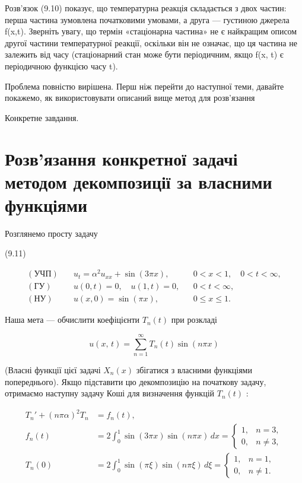 Розв'язок (9.10) показує, що температурна реакція складається з двох частин: перша частина зумовлена початковими умовами, а друга --- густиною джерела f(x,t). Зверніть увагу, що термін «стаціонарна частина» не є найкращим описом другої частини температурної реакції, оскільки він не означає, що ця частина не залежить від часу (стаціонарний стан може бути періодичним, якщо f(x, t) є періодичною функцією часу t).

Проблема повністю вирішена. Перш ніж перейти до наступної теми, давайте покажемо, як використовувати описаний вище метод для розв'язання

Конкретне завдання.

\section{Розв'язання конкретної задачі методом декомпозиції за власними функціями}\label{ux440ux43eux437ux432ux44fux437ux430ux43dux43dux44f-ux43aux43eux43dux43aux440ux435ux442ux43dux43eux457-ux437ux430ux434ux430ux447ux456-ux43cux435ux442ux43eux434ux43eux43c-ux434ux435ux43aux43eux43cux43fux43eux437ux438ux446ux456ux457-ux437ux430-ux432ux43bux430ux441ux43dux438ux43cux438-ux444ux443ux43dux43aux446ux456ux44fux43cux438}

Розглянемо просту задачу

(9.11)

\[
\begin{aligned}
(\text{УЧП})\quad & u_t = \alpha^2 u_{xx} + \sin(3\pi x), && 0 < x < 1,\quad 0 < t < \infty, \\
(\text{ГУ})\quad & u(0,t)=0,\quad u(1,t)=0, && 0 < t < \infty, \\
(\text{НУ})\quad & u(x,0)=\sin(\pi x), && 0 \le x \le 1.
\end{aligned}
\]

Наша мета --- обчислити коефіцієнти \(T_n(t)\) при розкладі

\[
u\left(x,\,t\right)=\sum_{n=1}^{\infty}T_n(t)\sin(n\pi x)
\]

(Власні функції цієї задачі \(X_n(x)\) збігатися з власними функціями попереднього). Якщо підставити цю декомпозицію на початкову задачу, отримаємо наступну задачу Коші для визначення функцій \(T_n(t)\) :

\[
\begin{aligned}
T_n' + (n\pi\alpha)^2 T_n &= f_n(t), \\
f_n(t) &= 2 \int_0^1 \sin(3\pi x)\sin(n\pi x)\,dx
= \begin{cases}
1, & n = 3, \\
0, & n \ne 3,
\end{cases} \\
T_n(0) &= 2 \int_0^1 \sin(\pi \xi)\sin(n\pi \xi)\,d\xi
= \begin{cases}
1, & n = 1, \\
0, & n \ne 1.
\end{cases}
\end{aligned}
\]

